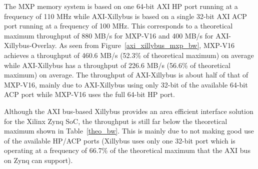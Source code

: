 

The MXP memory system is based on one 64-bit AXI HP port running at a frequency of 110 MHz while AXI-Xillybus is based on a single 32-bit AXI ACP port running at a frequency of 100 MHz. 
This corresponds to a theoretical maximum throughput of 880 MB/s for MXP-V16 and 400 MB/s for AXI-Xillybus-Overlay. 
As seen from Figure~\ref{axi_xillybus_mxp_bw}, MXP-V16 achieves a throughput of 460.6 MB/s (52.3\% of theoretical maximum) on average while AXI-Xillybus has a throughput of 226.6 MB/s (56.6\% of theoretical maximum) on average. 
The throughput of AXI-Xillybus is about half of that of MXP-V16, mainly due to AXI-Xillybus using only 32-bit of the available 64-bit ACP port while MXP-V16 uses the full 64-bit HP port. 


\begin{table}[tb]
	\caption{Area overhead of AXI bus-based systems.}
	\label{xillybus_mxp_area}
	\centering
\end{table}

Although the AXI bus-based Xillybus provides an area efficient interface solution for the Xilinx Zynq SoC, the throughput is still far below the theoretical maximum shown in Table~\ref{theo_bw}. 
This is mainly due to not making good use of the available HP/ACP ports (Xillybus uses only one 32-bit port which is operating at a frequency of 66.7\% of the theoretical maximum that the AXI bus on Zynq can support). 


